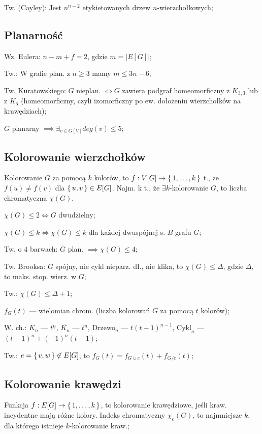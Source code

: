 Tw. (Cayley): Jest $n^{n-2}$ etykietowanych drzew $n$-wierzchołkowych;

\subsection{Planarność}

Wz. Eulera: $n - m + f = 2$, gdzie $m = |E[G]|$;

Tw.: W grafie plan. z $n \geq 3$ mamy $m \leq 3n -6$;

Tw. Kuratowskiego: $G$ nieplan. $\iff G$ zawiera podgraf homeomorficzny
  z $K_{3,3}$ lub z $K_5$ (homeomorficzny, czyli
  izomorficzny po ew. dołożeniu wierzchołków na krawędziach);

$G$ planarny $\implies \exists_{v \in G[V]} deg(v) \leq 5$;

\subsection{Kolorowanie wierzchołków}

Kolorowanie $G$ za pomocą $k$ kolorów, to
  $f: V[G] \rightarrow \set{1, \dots, k}$ t., że $f(u) \neq f(v)$ dla
  $\set{u, v} \in E[G]$. Najm. k t., że $\exists k$-kolorowanie $G$, to liczba
  chromatyczna $\chi (G)$.

$\chi(G) \leq 2 \Leftrightarrow G$ dwudzielny;

$\chi(G) \leq k \Leftrightarrow \chi(G) \leq k$ dla każdej dwuspójnej s. $B$
  grafu $G$;

Tw. o 4 barwach: $G$ plan. $\implies\chi(G)\leq 4$;

Tw. Brooksa: $G$ spójny, nie cykl nieparz. dł., nie klika, to
  $\chi(G) \leq \Delta$, gdzie $\Delta$, to maks. stop. wierz. w $G$;

Tw.: $\chi(G) \leq \Delta + 1$;

$f_G(t)$ --- wielomian chrom. (liczba kolorowań $G$ za pomocą $t$ kolorów);

W. ch.:
$K_n$ --- $t^{\underline{n}}$,
$\overline{K_n}$ --- $t^n$,
$\text{Drzewo}_n$ --- $t(t-1)^{n-1}$,
$\text{Cykl}_n$ --- $(t-1)^n + (-1)^n(t-1)$;

Tw.: $e = \set{v, w} \not\in E[G]$, to $f_G(t)=f_{G\cup e}(t) + f_{G/e}(t)$;

\subsection{Kolorowanie krawędzi}

Funkcja $f: E[G] \rightarrow \set{1, \dots, k}$, to kolorowanie krawędziowe,
  jeśli kraw. incydentne mają różne kolory. Indeks chromatyczny $\chi_e(G)$, to
  najmniejsze $k$, dla którego istnieje $k$-kolorowanie kraw.;

